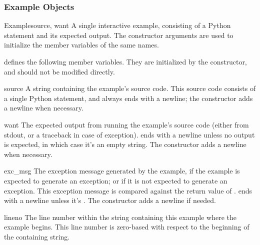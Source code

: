 \subsubsection{Example Objects\label{doctest-Example}}
\begin{classdesc}{Example}{source, want}
    A single interactive example, consisting of a Python statement and
    its expected output.  The constructor arguments are used to
    initialize the member variables of the same names.
\end{classdesc}

 defines the following member variables.  They are
initialized by the constructor, and should not be modified directly.

\begin{memberdesc}{source}
    A string containing the example's source code.  This source code
    consists of a single Python statement, and always ends with a
    newline; the constructor adds a newline when necessary.
\end{memberdesc}

\begin{memberdesc}{want}
    The expected output from running the example's source code (either
    from stdout, or a traceback in case of exception).  
    ends with a newline unless no output is expected, in which case
    it's an empty string.  The constructor adds a newline when
    necessary.
\end{memberdesc}

\begin{memberdesc}{exc_msg}
    The exception message generated by the example, if the example is
    expected to generate an exception; or  if it is not
    expected to generate an exception.  This exception message is
    compared against the return value of
    .  
    ends with a newline unless it's .  The constructor adds
    a newline if needed.
\end{memberdesc}

\begin{memberdesc}{lineno}
    The line number within the string containing this example where
    the example begins.  This line number is zero-based with respect
    to the beginning of the containing string.
\end{memberdesc}

